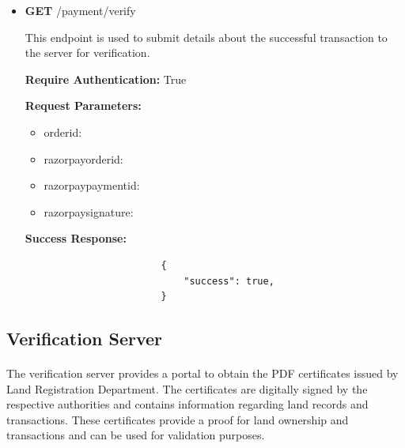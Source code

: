 \documentclass{article}
\begin{document}
\begin{itemize}
            \item \textbf{GET}  /payment/verify
                \begin{addmargin}[1em]{2em}%
                    This endpoint is used to submit details about the successful transaction to the server for verification.
                    \par\textbf{Require Authentication:} True
                    \par\textbf{Request Parameters:}
                    \begin{itemize}
                        \item order\textunderscore id:
                        \item razorpay\textunderscore order\textunderscore id:
                        \item razorpay\textunderscore payment\textunderscore id:
                        \item razorpay\textunderscore signature:
                    \end{itemize}
                    \par\textbf{Success Response:}
                    \begin{listing}[H]
                    \begin{verbatim}
                        {     
                            "success": true,
                        }
                    \end{verbatim}
                   \end{listing}
                \end{addmargin}
        
        \end{itemize}

    \subsection{Verification Server}
        \paragraph{}
        The verification server provides a portal to obtain the PDF certificates issued by Land Registration Department. The certificates are digitally signed by the respective authorities and contains information regarding land records and transactions. These certificates provide a proof for land ownership and transactions and can be used for validation purposes.
        
\end{document}
